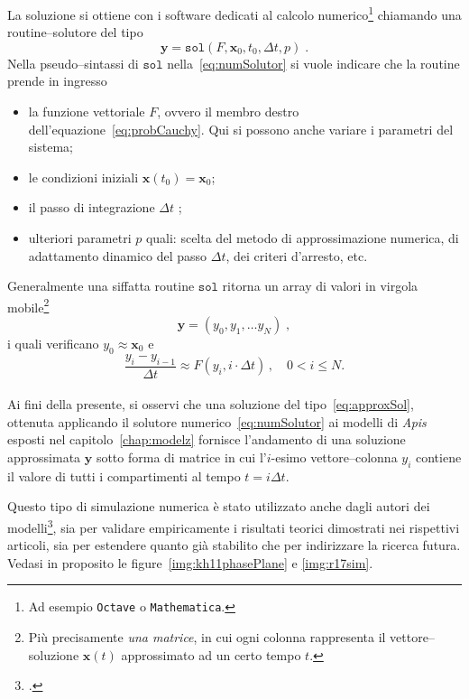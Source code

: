 La soluzione si ottiene con i software dedicati al calcolo numerico\footnote{Ad esempio \texttt{Octave} o
\texttt{Mathematica}.} chiamando una routine--solutore del tipo
\begin{equation}
\mathbf{y} = \mathtt{sol} ( F, \mathbf{x}_0, t_0, \Delta t, p) \; .
\label{eq:numSolutor}
\end{equation}
Nella pseudo--sintassi di $\mathtt{sol}$ nella~\eqref{eq:numSolutor} si vuole indicare che la routine prende in ingresso
\begin{itemize}
    \item la funzione vettoriale $F$, ovvero il membro destro dell'equazione~\eqref{eq:probCauchy}.
        Qui si possono anche variare i parametri del sistema;
    \item le condizioni iniziali $\mathbf{x} (t_0) = \mathbf{x}_0$;
    \item il passo di integrazione $\Delta t$ ;
    \item ulteriori parametri $p$ quali: scelta del metodo di approssimazione numerica, di adattamento dinamico del passo
        $\Delta t$, dei criteri d'arresto, etc.
\end{itemize}
Generalmente una siffatta routine $\mathtt{sol}$ ritorna un array di valori in virgola mobile\footnote{Più
precisamente \emph{una matrice}, in cui ogni colonna rappresenta il vettore--soluzione $\mathbf{x}(t)$ approssimato
ad un certo tempo $t$.}
\begin{equation}
\mathbf{y} = \left( y_0, y_1, \dots y_N \right) \; ,
\label{eq:approxSol}
\end{equation}
i quali verificano $y_0 \approx \mathbf{x}_0$ e
$$\frac{y_i - y_{i-1}}{\Delta t} \approx F \left( y_i, i \cdot \Delta t \right) \, , \quad 0 < i \leq N.$$

\paragraph{}
Ai fini della presente, si osservi che una soluzione del tipo~\eqref{eq:approxSol}, ottenuta applicando il solutore
numerico~\eqref{eq:numSolutor} ai modelli di \emph{Apis} esposti nel capitolo~\ref{chap:modelz} fornisce l'andamento
di una soluzione approssimata $\mathbf{y}$ sotto forma di matrice in cui l'$i$-esimo
vettore--colonna $y_i$ contiene il valore di
tutti i compartimenti al tempo $t = i \Delta t$.

Questo tipo di simulazione numerica è stato utilizzato anche dagli autori dei modelli\footcite{khoury2011,ratti2017},
sia per validare empiricamente i risultati teorici dimostrati nei rispettivi articoli, sia per estendere
quanto già stabilito che per indirizzare la ricerca futura. Vedasi in proposito le figure~\ref{img:kh11phasePlane} e
\ref{img:r17sim}.

